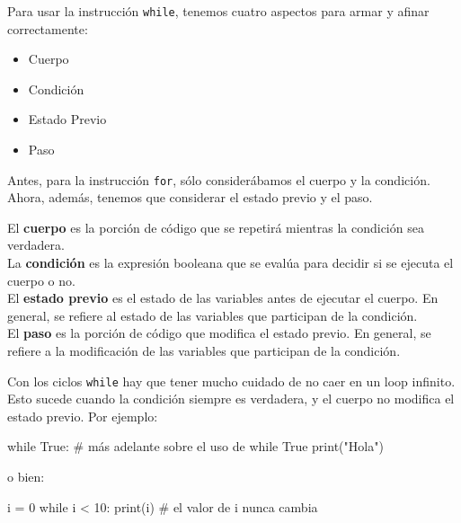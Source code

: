 \documentclass[
  letterpaper,
  DIV=11,
  numbers=noendperiod]{scrreprt}
\newenvironment{Shaded}{\begin{snugshade}}{\end{snugshade}}
\newcommand{\BuiltInTok}[1]{\textcolor[rgb]{0.00,0.23,0.31}{#1}}
\newcommand{\CommentTok}[1]{\textcolor[rgb]{0.37,0.37,0.37}{#1}}
\newcommand{\ControlFlowTok}[1]{\textcolor[rgb]{0.00,0.23,0.31}{#1}}
\newcommand{\DecValTok}[1]{\textcolor[rgb]{0.68,0.00,0.00}{#1}}
\newcommand{\NormalTok}[1]{\textcolor[rgb]{0.00,0.23,0.31}{#1}}
\newcommand{\OperatorTok}[1]{\textcolor[rgb]{0.37,0.37,0.37}{#1}}
\newcommand{\StringTok}[1]{\textcolor[rgb]{0.13,0.47,0.30}{#1}}
\newcommand{\VariableTok}[1]{\textcolor[rgb]{0.07,0.07,0.07}{#1}}
\providecommand{\tightlist}{%
  \setlength{\itemsep}{0pt}\setlength{\parskip}{0pt}}\usepackage{longtable,booktabs,array}
\begin{document}
Para usar la instrucción \texttt{while}, tenemos cuatro aspectos para
armar y afinar correctamente:

\begin{itemize}
\tightlist
\item
  Cuerpo
\item
  Condición
\item
  Estado Previo
\item
  Paso
\end{itemize}

Antes, para la instrucción \texttt{for}, sólo considerábamos el cuerpo y
la condición. Ahora, además, tenemos que considerar el estado previo y
el paso.

El \textbf{cuerpo} es la porción de código que se repetirá mientras la
condición sea verdadera.\\
La \textbf{condición} es la expresión booleana que se evalúa para
decidir si se ejecuta el cuerpo o no.\\
El \textbf{estado previo} es el estado de las variables antes de
ejecutar el cuerpo. En general, se refiere al estado de las variables
que participan de la condición.\\
El \textbf{paso} es la porción de código que modifica el estado previo.
En general, se refiere a la modificación de las variables que participan
de la condición.\\

\begin{tcolorbox}[enhanced jigsaw, bottomrule=.15mm, leftrule=.75mm, opacityback=0, colback=white, toprule=.15mm, bottomtitle=1mm, opacitybacktitle=0.6, rightrule=.15mm, left=2mm, arc=.35mm, coltitle=black, title=\textcolor{quarto-callout-warning-color}{\faExclamationTriangle}\hspace{0.5em}{Warning}, breakable, toptitle=1mm, colframe=quarto-callout-warning-color-frame, titlerule=0mm, colbacktitle=quarto-callout-warning-color!10!white]

Con los ciclos \texttt{while} hay que tener mucho cuidado de no caer en
un loop infinito. Esto sucede cuando la condición siempre es verdadera,
y el cuerpo no modifica el estado previo. Por ejemplo:

\begin{Shaded}
\begin{Highlighting}[]
\ControlFlowTok{while} \VariableTok{True}\NormalTok{: }\CommentTok{\# más adelante sobre el uso de \textasciigrave{}while True\textasciigrave{}}
    \BuiltInTok{print}\NormalTok{(}\StringTok{"Hola"}\NormalTok{)}
\end{Highlighting}
\end{Shaded}

o bien:

\begin{Shaded}
\begin{Highlighting}[]
\NormalTok{i }\OperatorTok{=} \DecValTok{0}
\ControlFlowTok{while}\NormalTok{ i }\OperatorTok{\textless{}} \DecValTok{10}\NormalTok{:}
    \BuiltInTok{print}\NormalTok{(i) }\CommentTok{\# el valor de i nunca cambia}
\end{Highlighting}
\end{Shaded}

\end{tcolorbox}
\end{document}
